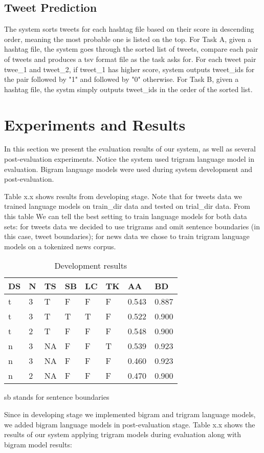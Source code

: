 \documentclass[11pt,a4paper]{article}
\begin{document}
\subsection{Tweet Prediction}
The system sorts tweets for each hashtag file based on their score in descending order, meaning the most probable one is listed on the top. For Task A, given a hashtag file, the system goes through the sorted list of tweets, compare each pair of tweets and produces a tsv format file as the task asks for. For each tweet pair twee\_1 and tweet\_2, if tweet\_1 has higher score, system outputs tweet\_ids for the pair followed by "1" and followed by "0" otherwise. For Task B, given a hashtag file, the systm simply outputs tweet\_ids in the order of the sorted list. 


\section{Experiments and Results}
In this section we present the evaluation results of our system, as well as several post-evaluation experiments. Notice the system used trigram language model in evaluation. Bigram language models were used during system development and post-evaluation.

Table x.x shows results from developing stage. Note that for tweets data we trained language models on train\_dir data and tested on trial\_dir data. From this table We can tell the best setting to train language models for both data sets: for tweets data we decided to use trigrams and omit sentence boundaries (in this case, tweet boundaries); for news data we chose to train trigram language models on a tokenized news corpus.

\begin{table}[h!]
\begin{tabular}{ |p{0.5cm}|p{0.5cm}|p{0.5cm}|p{0.5cm}|p{0.5cm}|p{0.5cm}|p{0.7cm}|p{0.7cm}|}
\hline
DS & N & TS  & SB & LC & TK & AA & BD \\
\hline
t & 3 & T & F & F & F & 0.543 & 0.887 \\
\hline
t & 3 & T & T & T & F & 0.522 & 0.900 \\
\hline
t & 2 & T & F & F & F & 0.548 & 0.900 \\ 
\hline
n & 3 & NA & F & F & T & 0.539 & 0.923 \\
\hline
n & 3 & NA & F & F & F & 0.460 & 0.923 \\
\hline
n & 2 & NA & F & F & F & 0.470 & 0.900 \\
\hline
\end{tabular}
\caption{Development results}
\medskip
sb stands for sentence boundaries 
\label{table:2}
\end{table}
Since in developing stage we implemented bigram and trigram language models, we added bigram language models in post-evaluation stage. Table x.x shows the results of our system applying trigram models during evaluation along with bigram model results: 
\end{document}
